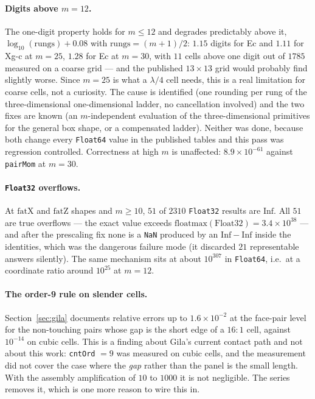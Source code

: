 \documentclass[11pt]{article}
\theoremstyle{remark}
\newcommand{\code}[1]{\texttt{#1}}
\begin{document}
\paragraph{Digits above $m = 12$.} The one-digit property holds for $m \le 12$ and degrades
predictably above it, $\log_{10}(\text{rungs}) + 0.08$ with $\text{rungs} = (m+1)/2$:
$1.15$ digits for Ec and $1.11$ for Xg-c at $m = 25$, $1.28$ for Ec at $m = 30$, with $11$
cells above one digit out of $1785$ measured on a coarse grid --- and the published
$13\times13$ grid would probably find slightly worse. Since $m = 25$ is what a $\lambda/4$
cell needs, this is a real limitation for coarse cells, not a curiosity. The cause is
identified (one rounding per rung of the three-dimensional one-dimensional ladder, no
cancellation involved) and the two fixes are known (an $m$-independent evaluation of the
three-dimensional primitives for the general box shape, or a compensated ladder). Neither
was done, because both change every \code{Float64} value in the published tables and this
pass was regression controlled. Correctness at high $m$ is unaffected: $8.9\times10^{-61}$
against \code{pairMom} at $m = 30$.

\paragraph{\code{Float32} overflows.} At $\mathrm{fatX}$ and $\mathrm{fatZ}$ shapes and
$m \ge 10$, $51$ of $2310$ \code{Float32} results are $\mathrm{Inf}$. All $51$ are true
overflows --- the exact value exceeds $\mathrm{floatmax}(\mathrm{Float32}) = 3.4\times10^{38}$
--- and after the prescaling fix none is a \code{NaN} produced by an
$\mathrm{Inf}-\mathrm{Inf}$ inside the identities, which was the dangerous failure mode
(it discarded $21$ representable answers silently). The same mechanism sits at about
$10^{307}$ in \code{Float64}, i.e.\ at a coordinate ratio around $10^{25}$ at $m = 12$.

\paragraph{The order-9 rule on slender cells.} Section~\ref{sec:gila} documents relative
errors up to $1.6\times10^{-2}$ at the face-pair level for the non-touching pairs whose gap
is the short edge of a $16{:}1$ cell, against $10^{-14}$ on cubic cells. This is a finding
about Gila's current contact path and not about this work: \code{cntOrd} $= 9$ was measured
on cubic cells, and the measurement did not cover the case where the \emph{gap} rather than
the panel is the small length. With the assembly amplification of $10$ to $1000$ it is not
negligible. The series removes it, which is one more reason to wire this in.
\end{document}
